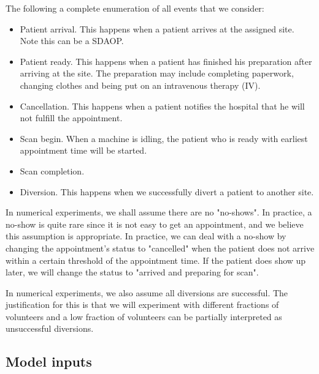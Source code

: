 The following a complete enumeration of all events that we consider:
\begin{itemize}
\item Patient arrival. This happens when a patient arrives at
      the assigned site. Note this can be a SDAOP.
\item Patient ready. This happens when a patient has finished his preparation
      after arriving at the site. The preparation may include completing
      paperwork, changing clothes and being put on an intravenous therapy (IV).
\item Cancellation. This happens when a patient notifies the hospital
      that he will not fulfill the appointment.
\item Scan begin. When a machine is idling, the patient who is ready
      with earliest appointment time will be started.
\item Scan completion.
\item Diversion. This happens when we successfully divert a patient
      to another site. 
\end{itemize}
In numerical experiments, we shall assume there are no "no-shows".
In practice, a no-show is quite rare since it is not easy to get an appointment,
and we believe this assumption is appropriate. In practice, we can deal
with a no-show by changing the appointment's status to "cancelled"
when the patient does not arrive within a certain threshold of
the appointment time. If the patient does show up later, we will
change the status to "arrived and preparing for scan".

In numerical experiments, we also assume all diversions are successful.
The justification for this is that we will experiment with different fractions of volunteers
and a low fraction of volunteers can be partially interpreted as
unsuccessful diversions.

\subsection{Model inputs}

